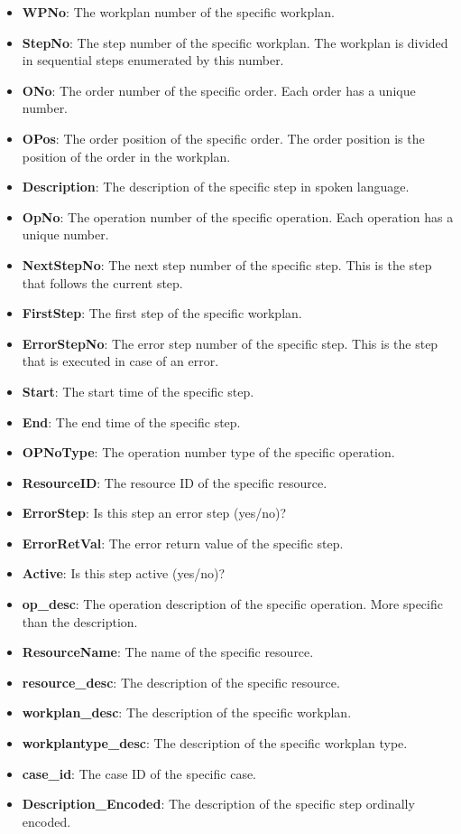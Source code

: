 \begin{itemize}
  \item \textbf{WPNo}: The workplan number of the specific workplan.
  \item \textbf{StepNo}: The step number of the specific workplan. The workplan is divided in sequential steps enumerated by this number.
  \item \textbf{ONo}: The order number of the specific order. Each order has a unique number.
  \item \textbf{OPos}: The order position of the specific order. The order position is the position of the order in the workplan.
  \item \textbf{Description}: The description of the specific step in spoken language.
  \item \textbf{OpNo}: The operation number of the specific operation. Each operation has a unique number.
  \item \textbf{NextStepNo}: The next step number of the specific step. This is the step that follows the current step.
  \item \textbf{FirstStep}: The first step of the specific workplan.
  \item \textbf{ErrorStepNo}: The error step number of the specific step. This is the step that is executed in case of an error.
  \item \textbf{Start}: The start time of the specific step.
  \item \textbf{End}: The end time of the specific step.
  \item \textbf{OPNoType}: The operation number type of the specific operation.
  \item \textbf{ResourceID}: The resource ID of the specific resource.
  \item \textbf{ErrorStep}: Is this step an error step (yes/no)?
  \item \textbf{ErrorRetVal}: The error return value of the specific step.
  \item \textbf{Active}: Is this step active (yes/no)?
  \item \textbf{op\_desc}: The operation description of the specific operation. More specific than the description.
  \item \textbf{ResourceName}: The name of the specific resource.
  \item \textbf{resource\_desc}: The description of the specific resource.
  \item \textbf{workplan\_desc}: The description of the specific workplan.
  \item \textbf{workplantype\_desc}: The description of the specific workplan type.
  \item \textbf{case\_id}: The case ID of the specific case.
  \item \textbf{Description\_Encoded}: The description of the specific step ordinally encoded.
\end{itemize}


